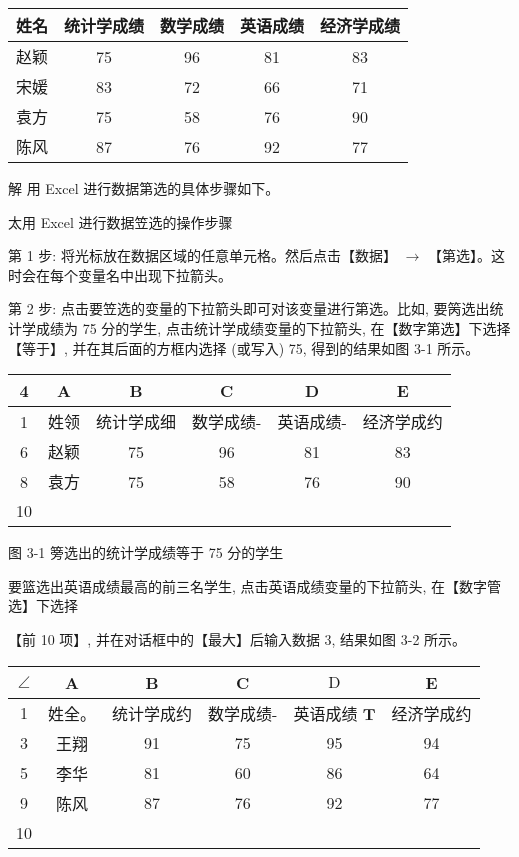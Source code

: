 \documentclass[10pt]{article}
\begin{document}
\begin{CJK*}{UTF8}{bsmi}
\begin{center}
\begin{tabular}{ccccc}
\hline
姓名 & 统计学成绩 & 数学成绩 & 英语成绩 & 经济学成绩 \\
\hline
赵颖 & 75 & 96 & 81 & 83 \\
宋媛 & 83 & 72 & 66 & 71 \\
袁方 & 75 & 58 & 76 & 90 \\
陈风 & 87 & 76 & 92 & 77 \\
\hline
\end{tabular}
\end{center}

解 用 Excel 进行数据第选的具体步骤如下。

太用 Excel 进行数据笠选的操作步骤

第 1 步: 将光标放在数据区域的任意单元格。然后点击【数据】 $\rightarrow$ 【第选】。这时会在每个变量名中出现下拉箭头。

第 2 步: 点击要笠选的变量的下拉箭头即可对该变量进行第选。比如, 要䇤选出统计学成绩为 75 分的学生, 点击统计学成绩变量的下拉箭头, 在【数字第选】下选择【等于】, 并在其后面的方框内选择 (或写入) 75, 得到的结果如图 3-1 所示。

\begin{center}
\begin{tabular}{|c|c|c|c|c|c|}
\hline
4 & A & B & C & D & E \\
\hline
1 & 姓领 & 统计学成细 & 数学成绩- & 英语成绩- & 经济学成约 \\
\hline
6 & 赵颖 & 75 & 96 & 81 & 83 \\
\hline
8 & 袁方 & 75 & 58 & 76 & 90 \\
\hline
10 &  &  &  &  &  \\
\hline
\end{tabular}
\end{center}

图 3-1 篣选出的统计学成绩等于 75 分的学生

要篮选出英语成绩最高的前三名学生, 点击英语成绩变量的下拉箭头, 在【数字管选】下选择

【前 10 项】, 并在对话框中的【最大】后输入数据 3, 结果如图 3-2 所示。

\begin{center}
\begin{tabular}{|c|c|c|c|c|c|}
\hline
$\angle$ & A & B & C & $\mathrm{D}$ & E \\
\hline
1 & 姓全。 & 统计学成约 & 数学成绩- & 英语成绩 $\mathbf{T}$ & 经济学成约 \\
\hline
3 & 王翔 & 91 & 75 & 95 & 94 \\
\hline
5 & 李华 & 81 & 60 & 86 & 64 \\
\hline
9 & 陈风 & 87 & 76 & 92 & 77 \\
\hline
10 &  &  &  &  &  \\
\hline
\end{tabular}
\end{center}


\end{CJK*}
\end{document}
